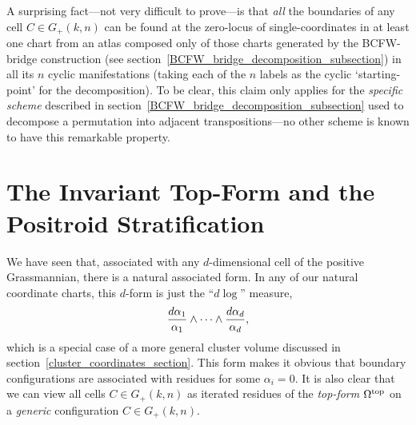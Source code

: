 \documentclass[12pt,hyperref,compress]{JHEP3}
\newcommand{\eq}[1]{\begin{equation}#1\end{equation}}
\begin{document}
{A surprising fact---not very difficult to prove---is that {\it all} the boundaries of any cell $C\!\in\!G_+(k,n)$ can be found at the zero-locus of single-coordinates in at least one chart from an atlas composed only of those charts generated by the BCFW-bridge construction (see \mbox{section \ref{BCFW_bridge_decomposition_subsection}}) in all its $n$ cyclic manifestations (taking each of the $n$ labels as the cyclic `starting-point' for the decomposition). To be clear, this claim only applies for the {\it specific scheme} described in \mbox{section \ref{BCFW_bridge_decomposition_subsection}} used to decompose a permutation into adjacent transpositions---no other scheme is known to have this remarkable property.









\newpage

\section{The Invariant Top-Form and the Positroid Stratification}\label{invariant_top_form_section}
We have seen that, associated with any $d$-dimensional cell of the positive Grassmannian, there is a natural associated form. In any of our natural coordinate charts, this $d$-form is just the ``$d\!\log$'' measure,
\vspace{-.2cm}\eq{\frac{d\alpha_1}{\alpha_1}\wedge\cdots\wedge\frac{d\alpha_d}{\alpha_d},\vspace{-.3cm}}
which is a special case of a more general cluster volume discussed in \mbox{section \ref{cluster_coordinates_section}}. This form makes it obvious that boundary configurations are associated with residues for some $\alpha_i=0$. It is also clear that we can view all cells $C\!\in\!G_+(k,n)$ as iterated residues of the {\it top-form} $\Omega^{{\rm top}}$ on a {\it generic} configuration \mbox{$C\!\in\!G_+(k,n)$}.

}
\end{document}
